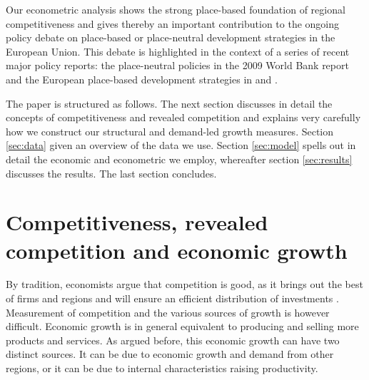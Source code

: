 \documentclass[11pt,parskip,abstracton,notitlepage, paper=a4]{scrartcl}
\begin{document}
Our econometric analysis shows the strong place-based foundation of regional competitiveness and gives thereby an important contribution to the ongoing policy debate on place-based or place-neutral development strategies in the European Union. This debate is highlighted in the context of a series of recent major policy reports: the place-neutral policies in the 2009 World Bank report \citep{worldbank2009} and the European place-based development strategies in \citet{barca2009agenda} and \citet{barca2012case}. 

The paper is structured as follows. The next section discusses in detail the concepts of competitiveness and revealed competition and explains very carefully how we construct our structural and demand-led growth measures. Section \ref{sec:data} given an overview of the data we use. Section \ref{sec:model} spells out in detail the economic and econometric we employ, whereafter section \ref{sec:results} discusses the results. The last section concludes. 

\section{Competitiveness, revealed competition and economic growth}

By tradition, economists argue that competition is good, as it brings out the best of firms and regions and will ensure an efficient distribution of investments \citep{glaeser2001economics}. Measurement of competition and the various sources of growth is however difficult. Economic growth is in general equivalent to producing and selling more products and services. As argued before, this economic growth can have two distinct sources. It can be due to economic growth and demand from other regions, or it can be due to internal characteristics raising productivity. 
\end{document}
